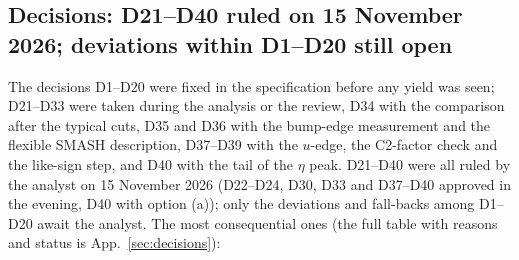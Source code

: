 \documentclass[11pt,a4paper]{article}
\begin{document}
\subsection{Decisions: D21--D40 ruled on 15 November 2026; deviations within D1--D20 still open}
\label{sec:res-decisions}
The decisions D1--D20 were fixed in the specification before any yield was seen; D21--D33 were taken during the analysis or the review,
D34 with the comparison after the typical cuts, D35 and D36 with the bump-edge measurement and the flexible SMASH description, D37--D39 with
the $u$-edge, the C2-factor check and the like-sign step, and D40 with the tail of the $\eta$ peak. D21--D40 were
all ruled by the analyst on 15 November 2026 (D22--D24, D30, D33 and D37--D40 approved in the evening, D40 with option (a)); only the deviations
and fall-backs among D1--D20 await the analyst. The most consequential ones (the full table
with reasons and status is App.~\ref{sec:decisions}):
\end{document}
